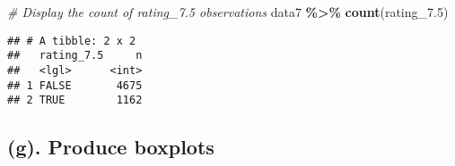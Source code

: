 \documentclass[
]{article}
\newenvironment{Shaded}{\begin{snugshade}}{\end{snugshade}}
\newcommand{\CommentTok}[1]{\textcolor[rgb]{0.56,0.35,0.01}{\textit{#1}}}
\newcommand{\FloatTok}[1]{\textcolor[rgb]{0.00,0.00,0.81}{#1}}
\newcommand{\FunctionTok}[1]{\textcolor[rgb]{0.13,0.29,0.53}{\textbf{#1}}}
\newcommand{\NormalTok}[1]{#1}
\newcommand{\SpecialCharTok}[1]{\textcolor[rgb]{0.81,0.36,0.00}{\textbf{#1}}}
\begin{document}
\begin{Shaded}
\begin{Highlighting}[]
\CommentTok{\# Display the count of rating\_7.5 observations}
\NormalTok{data7 }\SpecialCharTok{\%\textgreater{}\%} \FunctionTok{count}\NormalTok{(rating\_7}\FloatTok{.5}\NormalTok{)}
\end{Highlighting}
\end{Shaded}

\begin{verbatim}
## # A tibble: 2 x 2
##   rating_7.5     n
##   <lgl>      <int>
## 1 FALSE       4675
## 2 TRUE        1162
\end{verbatim}

\hypertarget{g.-produce-boxplots}{%
\subsection{(g). Produce boxplots}\label{g.-produce-boxplots}}
\end{document}
